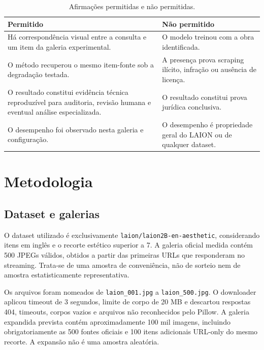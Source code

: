 \documentclass[12pt]{article}
\begin{document}
\begin{table}[H]
\centering
\caption{Afirmações permitidas e não permitidas.}
\label{tab:afirmacoes}
\begin{tabularx}{\linewidth}{Y Y}
\toprule
\textbf{Permitido} & \textbf{Não permitido}\\
\midrule
Há correspondência visual entre a consulta e um item da galeria experimental. &
O modelo treinou com a obra identificada.\\
O método recuperou o mesmo item-fonte sob a degradação testada. &
A presença prova scraping ilícito, infração ou ausência de licença.\\
O resultado constitui evidência técnica reproduzível para auditoria, revisão
humana e eventual análise especializada. &
O resultado constitui prova jurídica conclusiva.\\
O desempenho foi observado nesta galeria e configuração. &
O desempenho é propriedade geral do LAION ou de qualquer dataset.\\
\bottomrule
\end{tabularx}
\end{table}

\section{Metodologia}

\subsection{Dataset e galerias}

O dataset utilizado é exclusivamente \texttt{laion/laion2B-en-aesthetic},
considerando itens em inglês e o recorte estético superior a 7. A galeria
oficial medida contém 500 JPEGs válidos, obtidos a partir das primeiras URLs
que responderam no streaming. Trata-se de uma amostra de conveniência, não de
sorteio nem de amostra estatisticamente representativa.

Os arquivos foram nomeados de \texttt{laion\_001.jpg} a
\texttt{laion\_500.jpg}. O downloader aplicou timeout de 3 segundos, limite de
corpo de 20 MB e descartou respostas 404, timeouts, corpos vazios e arquivos
não reconhecidos pelo Pillow. A galeria expandida prevista contém
aproximadamente 100 mil imagens, incluindo obrigatoriamente as 500 fontes
oficiais e 100 itens adicionais URL-only do mesmo recorte. A expansão não
é uma amostra aleatória.
\end{document}

